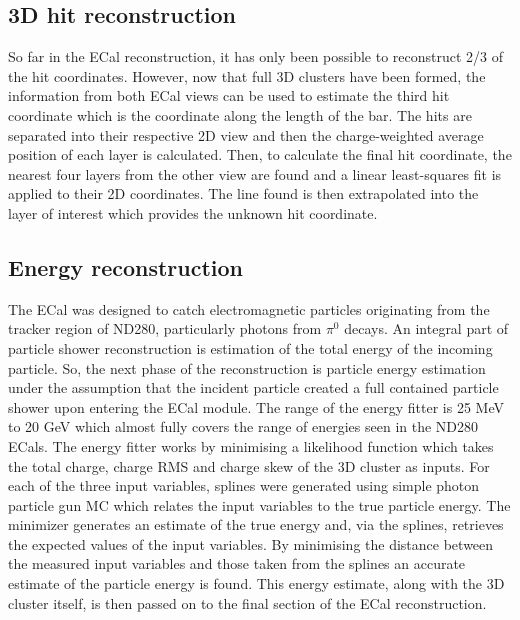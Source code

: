 \subsection{3D hit reconstruction}
\label{subsec:ECal3DHitReconstruction}
So far in the ECal reconstruction, it has only been possible to reconstruct 2/3 of the hit coordinates.  However, now that full 3D clusters have been formed, the information from both ECal views can be used to estimate the third hit coordinate which is the coordinate along the length of the bar.
\newline
\newline
The hits are separated into their respective 2D view and then the charge-weighted average position of each layer is calculated.  Then, to calculate the final hit coordinate, the nearest four layers from the other view are found and a linear least-squares fit is applied to their 2D coordinates.  The line found is then extrapolated into the layer of interest which provides the unknown hit coordinate.

\subsection{Energy reconstruction}
\label{subsec:ECalEnergyReconstruction}
The ECal was designed to catch electromagnetic particles originating from the tracker region of ND280, particularly photons from $\pi^0$ decays.  An integral part of particle shower reconstruction is estimation of the total energy of the incoming particle.  So, the next phase of the reconstruction is particle energy estimation under the assumption that the incident particle created a full contained particle shower upon entering the ECal module.  The range of the energy fitter is 25 MeV to 20 GeV which almost fully covers the range of energies seen in the ND280 ECals.  The energy fitter works by minimising a likelihood function which takes the total charge, charge RMS and charge skew of the 3D cluster as inputs.  For each of the three input variables, splines were generated using simple photon particle gun MC which relates the input variables to the true particle energy.  The minimizer generates an estimate of the true energy and, via the splines, retrieves the expected values of the input variables.  By minimising the distance between the measured input variables and those taken from the splines an accurate estimate of the particle energy is found.  This energy estimate, along with the 3D cluster itself, is then passed on to the final section of the ECal reconstruction.

